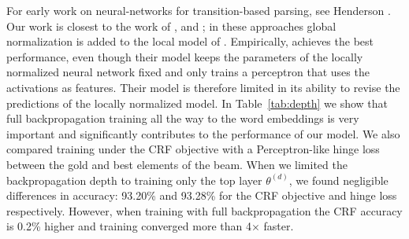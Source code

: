 For early work on neural-networks for transition-based parsing,
see Henderson .
Our work is closest to the work of
, 
and ;
in these approaches global normalization is added to the
local model of .
Empirically, 
achieves the best performance, even though
their model keeps the parameters of the locally
normalized neural network fixed and only
trains a perceptron that uses the activations as features.
Their model is therefore limited in its ability to
revise the predictions of the locally normalized model.
In Table~\ref{tab:depth} we show that full backpropagation
training all the way to the word embeddings
is very important and significantly contributes
to the performance of our model.
We also compared training under the CRF objective with a 
Perceptron-like hinge loss between the gold and best elements of the beam.
When we limited the backpropagation depth to training only the top layer $\theta^{(d)}$,
we found negligible differences in accuracy:
93.20\% and 93.28\% for the CRF objective and hinge loss respectively.
However, when training with full backpropagation the CRF accuracy 
is 0.2\% higher and training converged more than 4$\times$
faster.

\begin{table}[t]
  \centering
  \caption{WSJ dev set scores for successively deeper levels of backpropagation.
    The {\em full} parameter set corresponds to backpropagation all the way to the embeddings.
    $W_i$: hidden layer $i$ weights.
  }
  \label{tab:depth}
\end{table}


